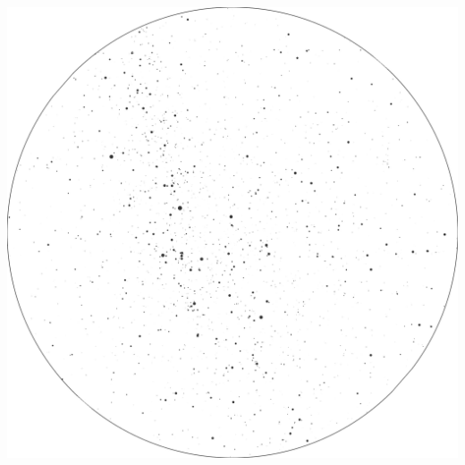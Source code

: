\documentclass{./SAS-class-skygen}
\begin{document}
	\vspace{0.5cm}
    \begin{center}
    \includegraphics[width=\textwidth]{./pics/skychart58.png}
    \end{center}
    
    
\end{document}
